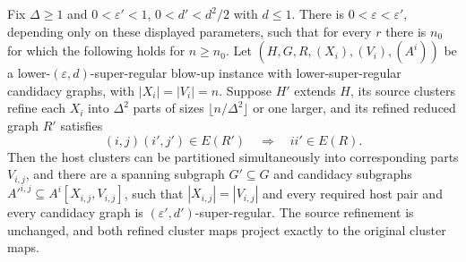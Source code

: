 \begin{lemma}
Fix $\Delta\geq1$ and $0<\varepsilon'<1$, $0<d'<d^2/2$ with $d\leq1$.  There is $0<\varepsilon<\varepsilon'$, depending only on these displayed parameters, such that for every $r$ there is $n_0$ for which the following holds for $n\geq n_0$.  Let $(H,G,R,(X_i),(V_i),(A^i))$ be a lower-$(\varepsilon,d)$-super-regular blow-up instance with lower-super-regular candidacy graphs, with $|X_i|=|V_i|=n$.  Suppose $H'$ extends $H$, its source clusters refine each $X_i$ into $\Delta^2$ parts of sizes $\lfloor n/\Delta^2\rfloor$ or one larger, and its refined reduced graph $R'$ satisfies
\[
 (i,j)(i',j')\in E(R')\quad\Longrightarrow\quad ii'\in E(R).
\]
Then the host clusters can be partitioned simultaneously into corresponding parts $V_{i,j}$, and there are a spanning subgraph $G'\subseteq G$ and candidacy subgraphs $A'^{i,j}\subseteq A^i[X_{i,j},V_{i,j}]$, such that $|X_{i,j}|=|V_{i,j}|$ and every required host pair and every candidacy graph is $(\varepsilon',d')$-super-regular.  The source refinement is unchanged, and both refined cluster maps project exactly to the original cluster maps.
\end{lemma}
